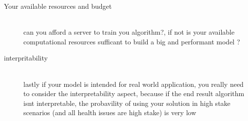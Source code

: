 \begin{description}
        \item [Your available resources and budget] \hfill \\
            can you afford a server to train you algorithm?, if not is your available computational resources sufficant to build a big and performant model ?
        \item [interpritability] \hfill \\
            lastly if your model is intended for real world application, you really need to consider the interpretability aspect, because if the end result algorithm isnt interpretable, the probavility of using your solution in high stake scenarios (and all health issues are high stake) is very low
    \end{description}